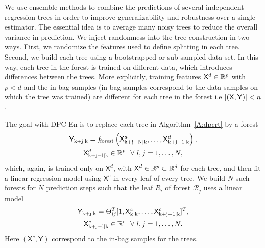 We use ensemble methods \cite{Friedman2001} to combine the predictions of several independent regression trees in order to improve generalizability and robustness over a single estimator. 
The essential idea is to average many noisy trees to reduce the overall variance in prediction.
We inject randomness into the tree construction in two ways. First, we randomize the features used to define splitting in each tree.
Second, we build each tree using a bootstrapped or sub-sampled data set.
In this way, each tree in the forest is trained on different data, which introduces differences between the trees. More explicitly, training features $\mathsf{X}^d \in \mathbb{R}^p$ with $p<d$ and the in-bag samples (in-bag samples correspond to the data samples on which the tree was trained) are different for each tree in the forest i.e $|(\mathsf{X},\mathsf{Y})|<n$.

The goal with DPC-En is to replace each tree in Algorithm~\ref{A:dpcrt} by a forest
\begin{gather}
\label{E:model_forest}
\mathsf{Y}_{\mathrm{k+j|k}} = \mathit{f}_{\mathrm{forest}} \left( \mathsf{X}^d_{\mathrm{k+j-N|k}} ,\dots,\mathsf{X}^d_{\mathrm{k+j-1|k}}  \right), \\ \nonumber
\mathsf{X}^d_{\mathrm{k+j-l|k}} \in \mathbb{R}^p \  \ \forall \ l,j=1,\dots,N,
\end{gather}
which, again, is trained only on $\mathsf{X}^d$, with $\mathsf{X}^d \in \mathbb{R}^p \subset \mathbb{R}^d$ for each tree,  and then fit a linear regression model using $\mathsf{X}^c$ in every leaf of every tree. We build $N$ such forests for $N$ prediction steps such that the leaf $R_i$ of forest $\mathcal{R}_j$ uses a linear model
\begin{gather}
\label{E:model_leaf_forest}
\mathsf{Y}_{\mathrm{k+j|k}} =  \Theta^T_{ij} [1,\mathsf{X}^c_{\mathrm{k|k}},\dots,\mathsf{X}^c_{\mathrm{k+j-1|k}} ]^T, \\ \nonumber
\mathsf{X}^c_{\mathrm{k+j-l|k}} \in \mathbb{R}^c \  \ \forall \ l,j=1,\dots,N.
\end{gather}
Here $(\mathsf{X}^c,\mathsf{Y})$ correspond to the in-bag samples for the trees.


